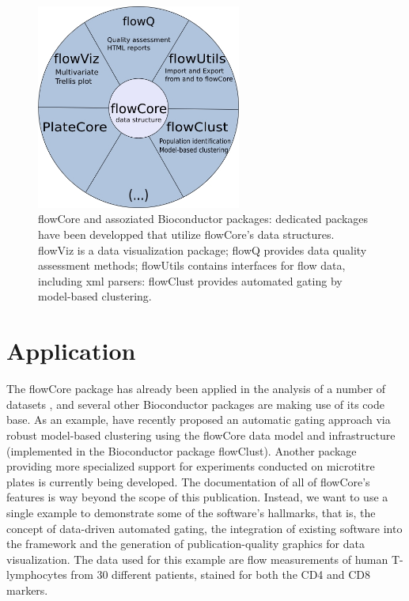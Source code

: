 \documentclass[12pt]{article}
\begin{document}
\begin{figure}
\centering
\includegraphics[width=0.6\textwidth]{Figure2-flowWheel-version4.jpg}
\caption{\label{fig2:flowWheel}{flowCore and assoziated Bioconductor
    packages: dedicated packages have been developped that utilize
    flowCore’s data structures. flowViz is a data visualization
    package; flowQ provides data quality assessment methods; flowUtils
    contains interfaces for flow data, including xml parsers:
    flowClust provides automated gating by model-based clustering.}}
\end{figure}


\section*{Application}
The flowCore package has already been applied in the analysis of a
number of datasets \citep{gasparetto2004ice,brinkman2007hcf}, and
several other Bioconductor packages are making use of its code
base. As an example, \cite{lo2008agf} have recently proposed an
automatic gating approach via robust model-based clustering using the
flowCore data model and infrastructure (implemented in the
Bioconductor package flowClust). Another package providing more
specialized support for experiments conducted on microtitre plates is
currently being developed. The documentation of all of flowCore's
features is way beyond the scope of this publication. Instead, we want
to use a single example to demonstrate some of the software's
hallmarks, that is, the concept of data-driven automated gating, the
integration of existing software into the framework and the generation
of publication-quality graphics for data visualization. The data used
for this example are flow measurements of human T-lymphocytes from 30
different patients, stained for both the CD4 and CD8 markers.
\end{document}
